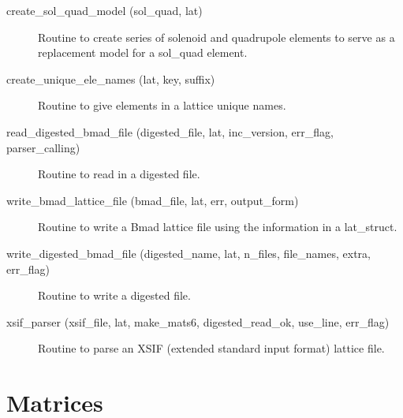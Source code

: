 \begin{description}
\label{r:create.sol.quad.model}
\item[create_sol_quad_model (sol_quad, lat)] \Newline 
Routine to create series of solenoid and quadrupole elements to serve as a replacement
model for a sol_quad element.

\label{r:create.unique.ele.names}
\item[create_unique_ele_names (lat, key, suffix)] \Newline 
Routine to give elements in a lattice unique names.

\label{r:read.digested.bmad.file}
\item[read_digested_bmad_file (digested_file, lat, inc_version, err_flag, parser_calling)] \Newline
Routine to read in a digested file. 

\label{r:write.bmad.lattice.file}
\item[write_bmad_lattice_file (bmad_file, lat, err, output_form)] \Newline 
Routine to write a Bmad lattice file using the information in
a lat_struct.

\label{r:write.digested.bmad.file}
\item[write_digested_bmad_file (digested_name, lat, n_files, file_names, extra, err_flag)] \Newline
Routine to write a digested file. 

\label{r:xsif.parser}
\item[xsif_parser (xsif_file, lat, make_mats6, digested_read_ok, use_line, err_flag)] \Newline 
     Routine to parse an XSIF (extended standard input format) lattice file.

\end{description}

\section{Matrices}
\label{r:mat}

